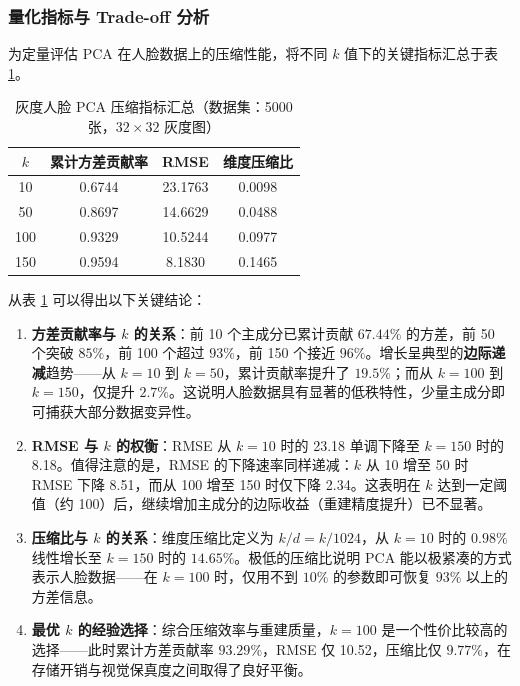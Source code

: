 \documentclass[a4paper]{article}
\begin{document}
\subsubsection{量化指标与 Trade-off 分析}

为定量评估 PCA 在人脸数据上的压缩性能，将不同 $k$ 值下的关键指标汇总于表 \ref{tab:face_metrics}。

\begin{table}[H]
\centering
\caption{灰度人脸 PCA 压缩指标汇总（数据集：5000 张，$32 \times 32$ 灰度图）}
\label{tab:face_metrics}
\begin{tabular}{cccc}
\toprule
$k$ & 累计方差贡献率 & RMSE & 维度压缩比 \\
\midrule
10  & 0.6744 & 23.1763 & 0.0098 \\
50  & 0.8697 & 14.6629 & 0.0488 \\
100 & 0.9329 & 10.5244 & 0.0977 \\
150 & 0.9594 & 8.1830  & 0.1465 \\
\bottomrule
\end{tabular}
\end{table}

从表 \ref{tab:face_metrics} 可以得出以下关键结论：

\begin{enumerate}
    \item \textbf{方差贡献率与 $k$ 的关系}：前 10 个主成分已累计贡献 $67.44\%$ 的方差，前 50 个突破 $85\%$，前 100 个超过 $93\%$，前 150 个接近 $96\%$。增长呈典型的\textbf{边际递减}趋势——从 $k=10$ 到 $k=50$，累计贡献率提升了 $19.5\%$；而从 $k=100$ 到 $k=150$，仅提升 $2.7\%$。这说明人脸数据具有显著的低秩特性，少量主成分即可捕获大部分数据变异性。

    \item \textbf{RMSE 与 $k$ 的权衡}：RMSE 从 $k=10$ 时的 23.18 单调下降至 $k=150$ 时的 8.18。值得注意的是，RMSE 的下降速率同样递减：$k$ 从 10 增至 50 时 RMSE 下降 8.51，而从 100 增至 150 时仅下降 2.34。这表明在 $k$ 达到一定阈值（约 100）后，继续增加主成分的边际收益（重建精度提升）已不显著。

    \item \textbf{压缩比与 $k$ 的关系}：维度压缩比定义为 $k / d = k / 1024$，从 $k=10$ 时的 $0.98\%$ 线性增长至 $k=150$ 时的 $14.65\%$。极低的压缩比说明 PCA 能以极紧凑的方式表示人脸数据——在 $k=100$ 时，仅用不到 $10\%$ 的参数即可恢复 $93\%$ 以上的方差信息。

    \item \textbf{最优 $k$ 的经验选择}：综合压缩效率与重建质量，$k=100$ 是一个性价比较高的选择——此时累计方差贡献率 $93.29\%$，RMSE 仅 10.52，压缩比仅 $9.77\%$，在存储开销与视觉保真度之间取得了良好平衡。
\end{enumerate}
\end{document}
